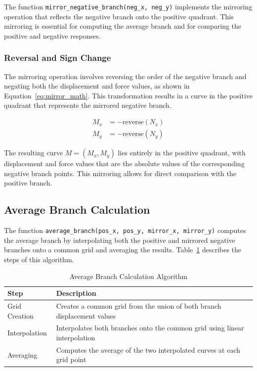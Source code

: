 \documentclass[11pt,a4paper]{article}
\begin{document}
The function \texttt{mirror\_negative\_branch(neg\_x, neg\_y)} implements the mirroring operation that reflects the negative branch onto the positive quadrant. This mirroring is essential for computing the average branch and for comparing the positive and negative responses.

\subsubsection{Reversal and Sign Change}

The mirroring operation involves reversing the order of the negative branch and negating both the displacement and force values, as shown in Equation~\ref{eq:mirror_math}. This transformation results in a curve in the positive quadrant that represents the mirrored negative branch.

\begin{align}
M_x &= -\text{reverse}(N_x) \\
M_y &= -\text{reverse}(N_y)
\label{eq:mirror_math}
\end{align}

The resulting curve \(M = (M_x, M_y)\) lies entirely in the positive quadrant, with displacement and force values that are the absolute values of the corresponding negative branch points. This mirroring allows for direct comparison with the positive branch.

\subsection{Average Branch Calculation}

The function \texttt{average\_branch(pos\_x, pos\_y, mirror\_x, mirror\_y)} computes the average branch by interpolating both the positive and mirrored negative branches onto a common grid and averaging the results. Table~\ref{tab:avg_algorithm} describes the steps of this algorithm.

\begin{table}[h]
\centering
\caption{Average Branch Calculation Algorithm}\label{tab:avg_algorithm}
\begin{tabular}{p{4cm}p{10cm}}
\toprule
\textbf{Step} & \textbf{Description} \\
\midrule
Grid Creation & Creates a common grid from the union of both branch displacement values \\
Interpolation & Interpolates both branches onto the common grid using linear interpolation \\
Averaging & Computes the average of the two interpolated curves at each grid point \\
\bottomrule
\end{tabular}
\end{table}
\end{document}
